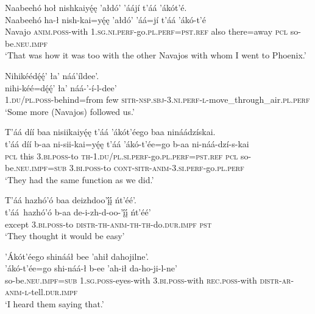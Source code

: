\ea\label{ex:text9-10-10}
Naabeehó hoł nishkaiyę́ę ’ałdó’ ’áájí t’áá ’ákót’é.\\
\gll Naabeehó	ha-ł	nish-kai=yę́ę	’ałdó’	’áá=jí	t’áá	’ákó-t’é\\
     Navajo	\textsc{anim}.\textsc{poss}-with	1.\textsc{sg}.\textsc{ni}.\textsc{perf}-go.\textsc{pl}.\textsc{perf}=\textsc{pst}.\textsc{ref}	also	there=away	\textsc{pcl}	so-be.\textsc{neu}.\textsc{impf}\\
\glt `That was how it was too with the other Navajos with whom I went to Phoenix.'
\z

\ea\label{ex:text9-11-1}
Nihikéédę́ę́’ ła’ náá’íldee’.\\
\gll nihi-kéé=dę́ę́’	ła’	náá-’-í-l-dee’\\
     1.\textsc{du}/\textsc{pl}.\textsc{poss}-behind=from	few	\textsc{sitr}-\textsc{nsp}.\textsc{sbj}-3.\textsc{ni}.\textsc{perf}-\textsc{l}-move\_through\_air.\textsc{pl}.\textsc{perf}\\
\glt `Some more (Navajos) followed us.'
\z

\ea\label{ex:text9-11-2}
T’áá díí baa nisiikaiyę́ę t’áá ’ákót’éego baa nináádzískai.\\
\gll t’áá	díí	b-aa	ni-sii-kai=yę́ę	t’áá	’ákó-t’ée=go	b-aa	ni-náá-dzí-s-kai\\
     \textsc{pcl}	this	3.\textsc{bi}.\textsc{poss}-to	\textsc{th}-1.\textsc{du}/\textsc{pl}.\textsc{si}.\textsc{perf}-go.\textsc{pl}.\textsc{perf}=\textsc{pst}.\textsc{ref}	\textsc{pcl}	so-be.\textsc{neu}.\textsc{impf}=\textsc{sub}	3.\textsc{bi}.\textsc{poss}-to	\textsc{cont}-\textsc{sitr}-\textsc{anim}-3.\textsc{si}.\textsc{perf}-go.\textsc{pl}.\textsc{perf}\\
\glt `They had the same function as we did.'
\z

\ea\label{ex:text9-11-3}
T’áá hazhó’ó baa deizhdoo’į́į́ ńt’éé’.\\
\gll t’áá~{hazhó’ó}	b-aa	de-i-zh-d-oo-’į́į́	ńt’éé’\\
     except	3.\textsc{bi}.\textsc{poss}-to	\textsc{distr}-\textsc{th}-\textsc{anim}-\textsc{th}-\textsc{th}-do.\textsc{dur}.\textsc{impf}	\textsc{pst}\\
\glt `They thought it would be easy'
\z

\ea\label{ex:text9-11-4}
’Ákót’éego shinááł bee ’ahił dahojilne’.\\
\gll ’ákó-t’ée=go	shi-náá-ł	b-ee	’ah-ił	da-ho-ji-l-ne’\\
     so-be.\textsc{neu}.\textsc{impf}=\textsc{sub}	1.\textsc{sg}.\textsc{poss}-eyes-with	3.\textsc{bi}.\textsc{poss}-with	\textsc{rec}.\textsc{poss}-with	\textsc{distr}-\textsc{ar}-\textsc{anim}-\textsc{l}-tell.\textsc{dur}.\textsc{impf}\\
\glt `I heard them saying that.'
\z

